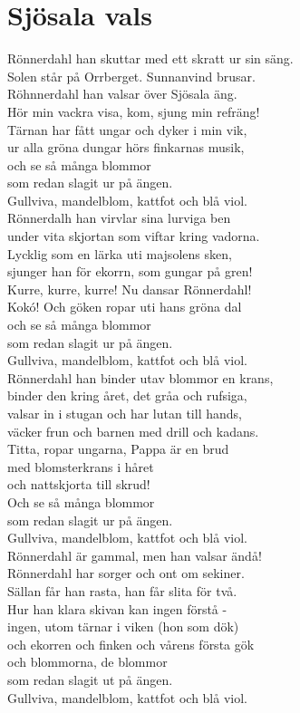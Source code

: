 \section{Sjösala vals}

Rönnerdahl han skuttar med ett skratt ur sin säng.\\
Solen står på Orrberget. Sunnanvind brusar.\\
Röhnnerdahl han valsar över Sjösala äng.\\
Hör min vackra visa, kom, sjung min refräng!\\
Tärnan har fått ungar och dyker i min vik,\\
ur alla gröna dungar hörs finkarnas musik,\\
och se så många blommor\\
som redan slagit ur på ängen.\\
Gullviva, mandelblom, kattfot och blå viol.\\

Rönnerdalh han virvlar sina lurviga ben\\
under vita skjortan som viftar kring vadorna.\\
Lycklig som en lärka uti majsolens sken,\\
sjunger han för ekorrn, som gungar på gren!\\
Kurre, kurre, kurre! Nu dansar Rönnerdahl!\\
Kokó! Och göken ropar uti hans gröna dal\\
och se så många blommor\\
som redan slagit ur på ängen.\\
Gullviva, mandelblom, kattfot och blå viol.\\

Rönnerdahl han binder utav blommor en krans,\\
binder den kring året, det gråa och rufsiga,\\
valsar in i stugan och har lutan till hands,\\
väcker frun och barnen med drill och kadans.\\
Titta, ropar ungarna, Pappa är en brud\\
med blomsterkrans i håret\\
och nattskjorta till skrud!\\
Och se så många blommor\\
som redan slagit ur på ängen.\\
Gullviva, mandelblom, kattfot och blå viol.\\

Rönnerdahl är gammal, men han valsar ändå!\\
Rönnerdahl har sorger och ont om sekiner.\\
Sällan får han rasta, han får slita för två.\\
Hur han klara skivan kan ingen förstå -\\
ingen, utom tärnar i viken (hon som dök)\\
och ekorren och finken och vårens första gök\\
och blommorna, de blommor\\
som redan slagit ut på ängen.\\
Gullviva, mandelblom, kattfot och blå viol.\\